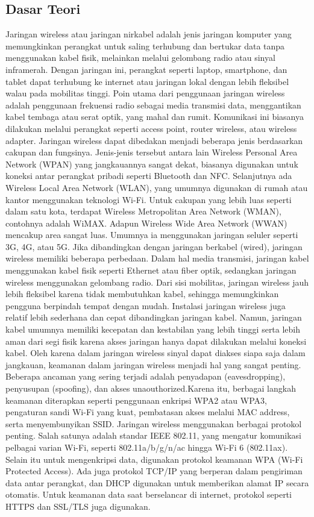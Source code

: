 \subsection{Dasar Teori}
Jaringan wireless atau jaringan nirkabel adalah jenis jaringan komputer yang memungkinkan perangkat untuk saling terhubung dan bertukar data tanpa menggunakan kabel fisik, melainkan melalui gelombang radio atau sinyal inframerah. Dengan jaringan ini, perangkat seperti laptop, smartphone, dan tablet dapat terhubung ke internet atau jaringan lokal dengan lebih fleksibel walau pada mobilitas tinggi. Poin utama dari penggunaan jaringan wireless adalah penggunaan frekuensi radio sebagai media transmisi data, menggantikan kabel tembaga atau serat optik, yang mahal dan rumit. Komunikasi ini biasanya dilakukan melalui perangkat seperti access point, router wireless, atau wireless adapter. Jaringan wireless dapat dibedakan menjadi beberapa jenis berdasarkan cakupan dan fungsinya. Jenis-jenis tersebut antara lain Wireless Personal Area Network (WPAN) yang jangkauannya sangat dekat, biasanya digunakan untuk koneksi antar perangkat pribadi seperti Bluetooth dan NFC. Selanjutnya ada Wireless Local Area Network (WLAN), yang umumnya digunakan di rumah atau kantor menggunakan teknologi Wi-Fi. Untuk cakupan yang lebih luas seperti dalam satu kota, terdapat Wireless Metropolitan Area Network (WMAN), contohnya adalah WiMAX. Adapun Wireless Wide Area Network (WWAN) mencakup area sangat luas. Umumnya ia menggunakan jaringan seluler seperti 3G, 4G, atau 5G. Jika dibandingkan dengan jaringan berkabel (wired), jaringan wireless memiliki beberapa perbedaan. Dalam hal media transmisi, jaringan kabel menggunakan kabel fisik seperti Ethernet atau fiber optik, sedangkan jaringan wireless menggunakan gelombang radio. Dari sisi mobilitas, jaringan wireless jauh lebih fleksibel karena tidak membutuhkan kabel, sehingga memungkinkan pengguna berpindah tempat dengan mudah. Instalasi jaringan wireless juga relatif lebih sederhana dan cepat dibandingkan jaringan kabel. Namun, jaringan kabel umumnya memiliki kecepatan dan kestabilan yang lebih tinggi serta lebih aman dari segi fisik karena akses jaringan hanya dapat dilakukan melalui koneksi kabel. Oleh karena dalam jaringan wireless sinyal dapat diakses siapa saja dalam jangkauan, keamanan dalam jaringan wireless menjadi hal yang sangat penting. Beberapa ancaman yang sering terjadi adalah penyadapan (eavesdropping), penyusupan (spoofing), dan akses unaouthorized.Karena itu, berbagai langkah keamanan diterapkan seperti penggunaan enkripsi WPA2 atau WPA3, pengaturan sandi Wi-Fi yang kuat, pembatasan akses melalui MAC address, serta menyembunyikan SSID. Jaringan wireless menggunakan berbagai protokol penting. Salah satunya adalah standar IEEE 802.11, yang mengatur komunikasi pelbagai varian Wi-Fi, seperti 802.11a/b/g/n/ac hingga Wi-Fi 6 (802.11ax). Selain itu untuk mengenkripsi data, digunakan protokol keamanan WPA (Wi-Fi Protected Access). Ada juga protokol TCP/IP yang berperan dalam pengiriman data antar perangkat, dan DHCP digunakan untuk memberikan alamat IP secara otomatis. Untuk keamanan data saat berselancar di internet, protokol seperti HTTPS dan SSL/TLS juga digunakan.

